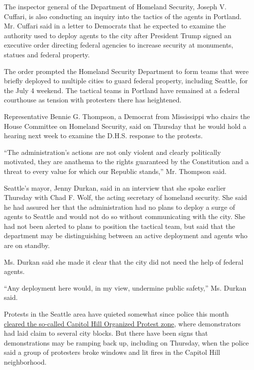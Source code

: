 The inspector general of the Department of Homeland Security, Joseph V.
Cuffari, is also conducting an inquiry into the tactics of the agents in
Portland. Mr. Cuffari said in a letter to Democrats that he expected to
examine the authority used to deploy agents to the city after President
Trump signed an executive order directing federal agencies to increase
security at monuments, statues and federal property.

The order prompted the Homeland Security Department to form teams that
were briefly deployed to multiple cities to guard federal property,
including Seattle, for the July 4 weekend. The tactical teams in
Portland have remained at a federal courthouse as tension with
protesters there has heightened.

Representative Bennie G. Thompson, a Democrat from Mississippi who
chairs the House Committee on Homeland Security, said on Thursday that
he would hold a hearing next week to examine the D.H.S. response to the
protests.

``The administration's actions are not only violent and clearly
politically motivated, they are anathema to the rights guaranteed by the
Constitution and a threat to every value for which our Republic
stands,'' Mr. Thompson said.

Seattle's mayor, Jenny Durkan, said in an interview that she spoke
earlier Thursday with Chad F. Wolf, the acting secretary of homeland
security. She said he had assured her that the administration had no
plans to deploy a surge of agents to Seattle and would not do so without
communicating with the city. She had not been alerted to plans to
position the tactical team, but said that the department may be
distinguishing between an active deployment and agents who are on
standby.

Ms. Durkan said she made it clear that the city did not need the help of
federal agents.

``Any deployment here would, in my view, undermine public safety,'' Ms.
Durkan said.

Protests in the Seattle area have quieted somewhat since police this
month
\href{https://www.nytimes.com/2020/07/01/us/seattle-protest-zone-CHOP-CHAZ-unrest.html}{cleared
the so-called Capitol Hill Organized Protest zone}, where demonstrators
had laid claim to several city blocks. But there have been signs that
demonstrations may be ramping back up, including on Thursday, when the
police said a group of protesters broke windows and lit fires in the
Capitol Hill neighborhood.

